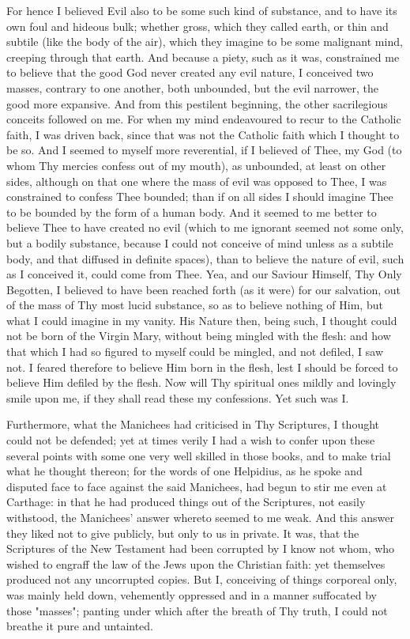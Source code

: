 \documentclass[b5paper,openright,12pt,twoside]{book}
\begin{document}
For hence I believed Evil also to be some such kind of substance, and
to have its own foul and hideous bulk; whether gross, which they called
earth, or thin and subtile (like the body of the air), which they
imagine to be some malignant mind, creeping through that earth. And
because a piety, such as it was, constrained me to believe that the good
God never created any evil nature, I conceived two masses, contrary
to one another, both unbounded, but the evil narrower, the good more
expansive. And from this pestilent beginning, the other sacrilegious
conceits followed on me. For when my mind endeavoured to recur to the
Catholic faith, I was driven back, since that was not the Catholic faith
which I thought to be so. And I seemed to myself more reverential, if I
believed of Thee, my God (to whom Thy mercies confess out of my mouth),
as unbounded, at least on other sides, although on that one where the
mass of evil was opposed to Thee, I was constrained to confess Thee
bounded; than if on all sides I should imagine Thee to be bounded by the
form of a human body. And it seemed to me better to believe Thee to have
created no evil (which to me ignorant seemed not some only, but a bodily
substance, because I could not conceive of mind unless as a subtile
body, and that diffused in definite spaces), than to believe the nature
of evil, such as I conceived it, could come from Thee. Yea, and our
Saviour Himself, Thy Only Begotten, I believed to have been reached
forth (as it were) for our salvation, out of the mass of Thy most lucid
substance, so as to believe nothing of Him, but what I could imagine in
my vanity. His Nature then, being such, I thought could not be born
of the Virgin Mary, without being mingled with the flesh: and how that
which I had so figured to myself could be mingled, and not defiled, I
saw not. I feared therefore to believe Him born in the flesh, lest
I should be forced to believe Him defiled by the flesh. Now will Thy
spiritual ones mildly and lovingly smile upon me, if they shall read
these my confessions. Yet such was I.

Furthermore, what the Manichees had criticised in Thy Scriptures, I
thought could not be defended; yet at times verily I had a wish to
confer upon these several points with some one very well skilled in
those books, and to make trial what he thought thereon; for the words
of one Helpidius, as he spoke and disputed face to face against the
said Manichees, had begun to stir me even at Carthage: in that he
had produced things out of the Scriptures, not easily withstood, the
Manichees' answer whereto seemed to me weak. And this answer they
liked not to give publicly, but only to us in private. It was, that the
Scriptures of the New Testament had been corrupted by I know not whom,
who wished to engraff the law of the Jews upon the Christian faith: yet
themselves produced not any uncorrupted copies. But I, conceiving of
things corporeal only, was mainly held down, vehemently oppressed and
in a manner suffocated by those "masses"; panting under which after the
breath of Thy truth, I could not breathe it pure and untainted.
\end{document}
